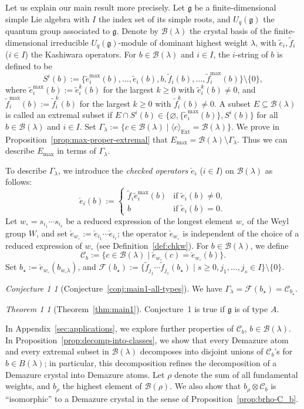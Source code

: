 \documentclass[reqno]{amsart}
\theoremstyle{definition}
\theoremstyle{remark}
\newtheorem*{maintheorem1}{Theorem 1}
\newtheorem*{introconjA}{Conjecture 1}
\numberwithin{equation}{section}
\newcommand{\g}{\mathfrak{g}}
\newcommand{\B}{\mathcal{B}}
\newcommand{\F}{\mathcal{F}}
\newcommand{\Ext}{\operatorname{Ext}}
\newcommand{\Gl}{\Gamma_\lambda}
\newcommand{\wo}{w_\circ}
\newcommand{\te}{\tilde e}
\newcommand{\tf}{\tilde f}
\newcommand{\chke}{\check e}
\newcommand{\bstar}{b_\star}
\newcommand{\Bl}{\B(\lambda)}
\begin{document}
Let us explain our main result more precisely.
Let $\g$ be a finite-dimensional simple Lie algebra with $I$ the index set of its simple roots,
and $U_q(\g)$ the quantum group associated to $\g$.
Denote by $\Bl$ the crystal basis of the finite-dimensional irreducible $U_q(\g)$-module of dominant highest weight $\lambda$,
with $\te_i,\tf_i$ ($i\in I$) the Kashiwara operators.
For $b\in\Bl$ and $i\in I$, the $i$-string of $b$ is defined to be
\[
S^i(b):=\{\te_i^{\max}(b),\dots,\te_i(b),b,\tf_i(b),\dots,\tf_i^{\max}(b)\}\setminus\{0\},
\]
where $\te_i^{\max}(b):=\te_i^{k}(b)$ for the largest $k\ge0$ with $\te_i^k(b)\ne0$,
and $\tf_i^{\max}(b):=\tf_i^{k}(b)$ for the largest $k\ge0$ with $\tf_i^k(b)\ne0$.
A subset $E\subseteq\Bl$ is called an extremal subset if
$E\cap S^i(b)\in\{\varnothing,\{\te_i^{\max}(b)\},S^i(b)\}$
for all $b\in\Bl$ and $i\in I$.
Set $\Gl:=\{c\in\Bl\mid \langle c\rangle_{\Ext}=\Bl\}$.
We prove in Proposition~\ref{prop:max-proper-extremal} that $E_{\max}=\Bl\setminus\Gl$.
Thus we can describe $E_{\max}$ in terms of $\Gl$.

To describe $\Gl$, we introduce the \emph{checked operators} $\chke_i$ ($i\in I$) on $\Bl$ as follows:
\[
\chke_i(b):=
\begin{cases}
	\tf_i\te_i^{\max}(b) & \text{if } \te_i(b)\ne0,\\
	b & \text{if } \te_i(b)=0.
\end{cases}
\]
Let $w_\circ=s_{i_1}\cdots s_{i_\ell}$ be a reduced expression of the longest element $w_\circ$
of the Weyl group $W$, and set $\chke_{w_\circ}:=\chke_{i_1}\cdots\chke_{i_\ell}$;
the operator $\chke_{w_\circ}$ is independent of the choice of a reduced expression of $w_\circ$ (see Definition~\ref{def:chkw}).
For $b\in\Bl$, we define
\[
\mathcal{C}_b:=\{c\in\Bl\mid \chke_{w_\circ}(c)=\chke_{w_\circ}(b)\}.
\]
Set $\bstar:=\chke_{w_\circ}(b_{\wo\lambda})$, and $\F(\bstar):=\{\tf_{j_1}\cdots\tf_{j_s}(\bstar)\mid s\ge0, j_1,\dots,j_s\in I\}\setminus\{0\}$.

\begin{introconjA}[Conjecture~\ref{conj:main1-all-types}]
	We have $\Gl=\F(\bstar)=\mathcal{C}_{\bstar}$.
\end{introconjA}

\begin{maintheorem1}[Theorem~\ref{thm:main1}]
	Conjecture~1 is true if $\g$ is of type $A$.
\end{maintheorem1}

In Appendix~\ref{sec:applications}, we explore further properties of $\mathcal{C}_b$, $b\in\Bl$.
In Proposition~\ref{prop:decomp-into-classes},
we show that every Demazure atom and every
extremal subset in $\Bl$ decomposes into disjoint unions of
$\mathcal{C}_{b}$'s for $b \in B(\lambda)$;
in particular, this decomposition refines the
decomposition of a Demazure crystal into Demazure atoms.
Let $\rho$ denote the sum of all fundamental weights,
and $b_\rho$ the highest element of $\B(\rho)$.
We also show that $b_\rho\otimes\mathcal{C}_b$ is ``isomorphic'' to a Demazure crystal
in the sense of Proposition~\ref{prop:brho-C_b}.
\end{document}
